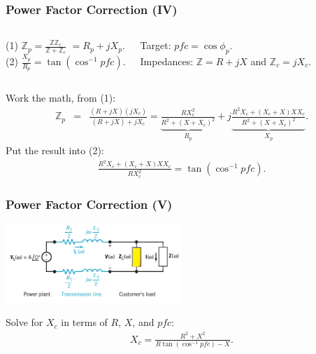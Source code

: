 \documentclass{beamer}
\begin{document}
\begin{frame}[fragile]
\frametitle{Power Factor Correction (IV)}

{\color{blue}\small
\begin{columns}[c]
(1) $\mathbb{Z}_p = \frac{\mathbb{Z} \mathbb{Z}_c}{\mathbb{Z} + \mathbb{Z}_c}$
$= R_p +jX_p$.
\\
(2) $\frac{X_p}{R_p} = \tan ( \cos^{-1} pfc )$.

Target: $pfc = \cos \phi_p$.
\\
Impedances: $\mathbb{Z} = R + jX$
and $\mathbb{Z}_c = jX_c$.
\end{columns}
}%
\vspace{0.5cm}

Work the math, from (1):
\begin{eqnarray}
\mathbb{Z}_p &=& \frac{(R + jX) (jX_c)}{(R + jX) + jX_c}
= \underbrace{\frac{R X_c^2}{R^2 + (X + X_c)^2}}_{R_p} + j \underbrace{\frac{R^2 X_c + (X_c + X) X X_c}{R^2 + (X + X_c)^2}}_{X_p}
\nonumber .
\end{eqnarray}
Put the result into (2):
\begin{eqnarray}
\frac{R^2 X_c + (X_c + X) X X_c}{R X_c^2} = \tan ( \cos^{-1} pfc )
\nonumber .
\end{eqnarray}

\end{frame}



\begin{frame}[fragile]
\frametitle{Power Factor Correction (V)}

\begin{center}
\includegraphics[width=0.5\textwidth]{src/pfc0.png}
\end{center}

Solve for $X_c$ in terms of $R$, $X$, and $pfc$:
\begin{eqnarray}
X_c = \frac{R^2 + X^2}{R \tan(\cos^{-1} pfc) - X}
\label{eq: pf correction}.
\end{eqnarray}

\end{frame}
\end{document}
